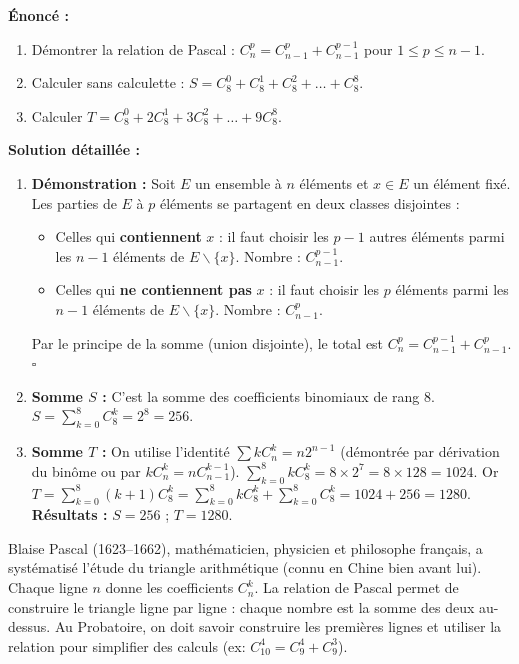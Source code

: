\documentclass[11pt]{article}
\providecommand{\qed}{\hfill$\square$}
\def\setminus{\mathbin{\backslash}}\let\smallsetminus\setminus
\begin{document}
\begin{exoresolu}
\textbf{Énoncé :}
\begin{enumerate}
    \item Démontrer la relation de Pascal : $C_n^p = C_{n-1}^p + C_{n-1}^{p-1}$ pour $1 \le p \le n-1$.
    \item Calculer sans calculette : $S = C_8^0 + C_8^1 + C_8^2 + \dots + C_8^8$.
    \item Calculer $T = C_8^0 + 2C_8^1 + 3C_8^2 + \dots + 9C_8^8$.
\end{enumerate}
\tcblower
\textbf{Solution détaillée :}
\begin{enumerate}
    \item \textbf{Démonstration :} Soit $E$ un ensemble à $n$ éléments et $x \in E$ un élément fixé.
    Les parties de $E$ à $p$ éléments se partagent en deux classes disjointes :
    \begin{itemize}
        \item Celles qui \textbf{contiennent} $x$ : il faut choisir les $p-1$ autres éléments parmi les $n-1$ éléments de $E \setminus \{x\}$. Nombre : $C_{n-1}^{p-1}$.
        \item Celles qui \textbf{ne contiennent pas} $x$ : il faut choisir les $p$ éléments parmi les $n-1$ éléments de $E \setminus \{x\}$. Nombre : $C_{n-1}^p$.
    \end{itemize}
    Par le principe de la somme (union disjointe), le total est $C_n^p = C_{n-1}^{p-1} + C_{n-1}^p$. \qed
    \item \textbf{Somme $S$ :} C'est la somme des coefficients binomiaux de rang 8. $S = \sum_{k=0}^8 C_8^k = 2^8 = 256$.
    \item \textbf{Somme $T$ :} On utilise l'identité $\sum k C_n^k = n 2^{n-1}$ (démontrée par dérivation du binôme ou par $k C_n^k = n C_{n-1}^{k-1}$).
    $\sum_{k=0}^8 k C_8^k = 8 \times 2^7 = 8 \times 128 = 1024$.
    Or $T = \sum_{k=0}^8 (k+1) C_8^k = \sum_{k=0}^8 k C_8^k + \sum_{k=0}^8 C_8^k = 1024 + 256 = 1280$.
    \textbf{Résultats :} $S = 256$ ; $T = 1280$.
\end{enumerate}
\end{exoresolu}

\begin{savaistu}
Blaise Pascal (1623--1662), mathématicien, physicien et philosophe français, a systématisé l'étude du triangle arithmétique (connu en Chine bien avant lui). Chaque ligne $n$ donne les coefficients $C_n^k$. La relation de Pascal permet de construire le triangle ligne par ligne : chaque nombre est la somme des deux au-dessus. Au Probatoire, on doit savoir construire les premières lignes et utiliser la relation pour simplifier des calculs (ex: $C_{10}^4 = C_9^4 + C_9^3$).
\end{savaistu}
\end{document}
